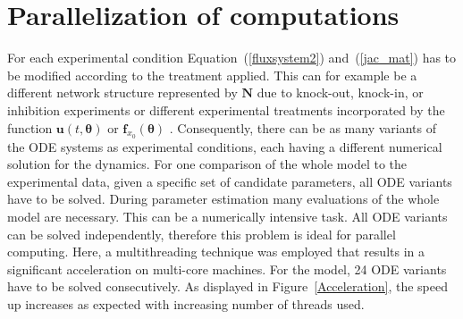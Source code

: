 \documentclass[12pt,a4paper]{scrartcl}
\begin{document}
\section{Parallelization of computations} \label{sec:parallel}
For each experimental condition Equation~(\ref{fluxsystem2}) and~(\ref{jac_mat}) has to be modified 
according to the treatment applied. This can for example be a different network structure represented by $
\mathbf{N}$ due to knock-out, knock-in, or inhibition experiments or different experimental treatments 
incorporated by the function $\mathbf{u}(t, \boldsymbol{\theta})$ or $\mathbf{f}_{x_0}(\boldsymbol{\theta})$ . 
Consequently, there can be as many variants of the ODE systems as experimental conditions, each having 
a different numerical solution for the dynamics. For one comparison of the whole model to the experimental 
data, given a specific set of candidate parameters, all ODE variants have to be solved. During parameter 
estimation many evaluations of the whole model are necessary. This can be a numerically intensive task. All 
ODE variants can be solved independently, therefore this problem is ideal for parallel computing. Here, a 
multithreading technique was employed that results in a significant acceleration on multi-core machines. For 
the \citet{Bachmann:2011fk} model, 24 ODE variants have to be solved consecutively. As displayed in 
Figure~\ref{Acceleration}, the speed up increases as expected with increasing number of threads used.
\end{document}
